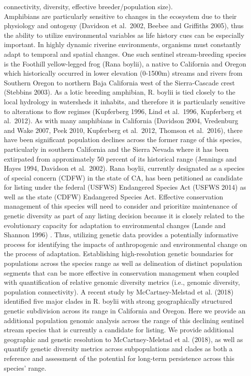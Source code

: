 \documentclass[twoside,12pt,final]{ucthesis-CA2012} %
\begin{document}
\begin{ucmainmatter}
connectivity, diversity, effective breeder/population size).\\
Amphibians are particularly sensitive to changes in the ecosystem due to
their physiology and ontogeny (Davidson et al.~2002, Beebee and
Griffiths 2005), thus the ability to utilize environmental variables as
life history cues can be especially important. In highly dynamic
riverine environments, organisms must constantly adapt to temporal and
spatial changes. One such sentinel stream-breeding species is the
Foothill yellow-legged frog (Rana boylii), a native to California and
Oregon which historically occurred in lower elevation (0-1500m) streams
and rivers from Southern Oregon to northern Baja California west of the
Sierra-Cascade crest (Stebbins 2003). As a lotic breeding amphibian, R.
boylii is tied closely to the local hydrology in watersheds it inhabits,
and therefore it is particularly sensitive to alterations to flow
regimes (Kupferberg 1996, Lind et al.~1996, Kupferberg et al.~2012). As
with many amphibians in California (Davidson 2004, Vredenburg and Wake
2007, Peek 2010, Kupferberg et al.~2012, Thomson et al.~2016), there
have been significant population declines across the former range of
this species, particularly in southern California and the Sierra Nevada
where it has been extirpated from approximately 50 percent of its
historical range (Jennings and Hayes 1994, Davidson et al.~2002). Rana
boylii, currently designated as a species of special concern (CDFW) in
the state of CA, has been petitioned as candidate for listing under the
federal (USFWS) Endangered Species Act (USFWS 2014) as well as the state
(CDFW) Endangered Species Act. Effective conservation management of this
species will need to consider and prioritize maintenance of genetic
diversity as part of any listing decision because it is closely related
to the evolutionary capacity for adaptation to environmental changes
(Lande and Shannon 1996) . Thus, utilizing genetic data provides a
potentially informative process for identifying the impacts of
anthropogenic and environmental change on the process of adaptation.
Establishing high-resolution genetic boundaries for populations across
the species range as well as delineation of distinct population segments
that can be more effective in conservation management when coupled with
quantification of relative genomic diversity metrics (i.e., genomic
diversity, population connectivity). A recent study by McCartney-Melstad
et al. (2018) identified five major clades in R. boylii with strong
geographically structured genetic subdivision across its range in
California and Oregon. Here we provide an additional population genomic
analysis across the range of this declining sentinel stream species that
is currently a candidate for listing. We provide additional geographic
and genetic resolution to McCartney-Melstad et al. (2018), as well as
quantify genetic diversity metrics across subpopulations and clades as
both a reference and assessment of the potential for long-term
persistence across this species' range.


\end{ucmainmatter}
\end{document}

